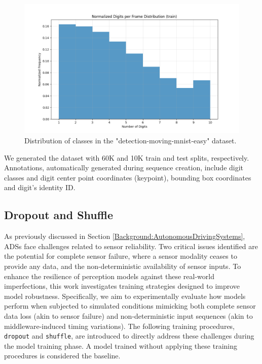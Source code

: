 \begin{figure}
    \centering
    \includegraphics[width=\textwidth]{figures/figure_method_dataset_train_digits_per_frame.png}
    \caption{Distribution of classes in the "detection-moving-mnist-easy" dataset.}
    \label{fig:figure_method_dataset_train_digits_per_frame}
\end{figure}

We generated the dataset with 60K and 10K train and test splits, respectively. Annotations, automatically generated during sequence creation, include digit classes and digit center point coordinates (keypoint), bounding box coordinates and digit's identity ID.

\subsection{Dropout and Shuffle} \label{Methods:DropoutAndShuffle}

As previously discussed in Section \ref{Background:AutonomousDrivingSystems}, ADSs face challenges related to sensor reliability. Two critical issues identified are the potential for complete sensor failure, where a sensor modality ceases to provide any data, and the non-deterministic availability of sensor inputs. To enhance the resilience of perception models against these real-world imperfections, this work investigates training strategies designed to improve model robustness. Specifically, we aim to experimentally evaluate how models perform when subjected to simulated conditions mimicking both complete sensor data loss (akin to sensor failure) and non-deterministic input sequences (akin to middleware-induced timing variations). The following training procedures, \texttt{dropout} and \texttt{shuffle}, are introduced to directly address these challenges during the model training phase. A model trained without applying these training procedures is considered the baseline.

